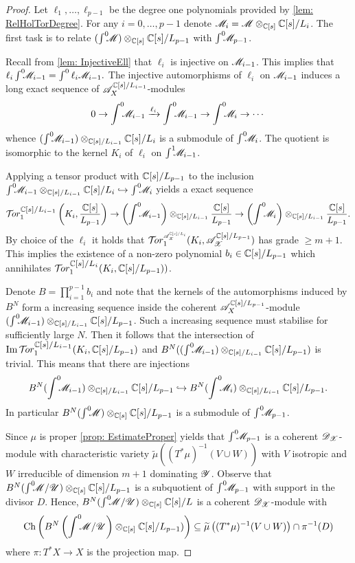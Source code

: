 \begin{proof}
  Let $\ell_1,\ldots,\ell_{p-1}$ be the degree one polynomials provided by \cref{lem: RelHolTorDegree}.
  For any $i=0,\ldots, p-1$ denote $\mathscr{M}_i =  \mathscr{M} \otimes_{\mathbb{C}[s]} \mathbb{C}[s]/L_{i}$.
  The first task is to relate $(\int^0 \mkern -8mu\mathscr{M}) \otimes_{\mathbb{C}[s]} \mathbb{C}[s]/L_{p-1}$ with $\int^0 \mkern -8mu\mathscr{M}_{p-1}$.

  Recall from \cref{lem: InjectiveEll} that $\ell_{i}$ is injective on $\mathscr{M}_{i-1}$.
  This implies that
  $\ell_{i}\int^0 \mkern -8mu \mathscr{M}_{i-1} = \int^0 \ell_{i}\mathscr{M}_{i-1}.$
  The injective automorphisms of $\ell_i$ on $\mathscr{M}_{i-1}$ induces a long exact sequence of $\mathscr{A}_X^{\mathbb{C}[s]/L_{i-1}}$-modules
  $$0 \to \int^0 \mkern -8mu\mathscr{M}_{i-1} \xrightarrow{\ell_i} \int^0 \mkern -8mu \mathscr{M}_{i-1} \to \int^0 \mkern -8mu \mathscr{M}_i \to \cdots $$
  whence $(\int^0 \mkern -8mu \mathscr{M}_{i-1})\otimes_{\mathbb{C}[s]/L_{i-1}} \mathbb{C}[s]/L_i$ is a submodule of $\int^0 \mkern -8mu\mathscr{M}_i$.
  The quotient is isomorphic to the kernel $K_i$ of $\ell_i$ on $\int^1\mkern -8mu\mathscr{M}_{i-1}$.

  Applying a tensor product with $\mathbb{C}[s]/L_{p-1}$ to the inclusion $\int^0 \mkern -8mu \mathscr{M}_{i-1} \otimes_{\mathbb{C}[s]/L_{i-1}} \mathbb{C}[s]/L_i \hookrightarrow \int^0 \mkern -8mu\mathscr{M}_i$ yields a exact sequence
  $$\Tr{\C[s]/L_{i-1}}{1}\left(K_i, \frac{\C[s]}{L_{p-1}}\right) \to \left(\Int \M_{i-1}\right) \otimes_{\C[s]/L_{i-1}}\frac{\C[s]}{L_{p-1}} \to \left(\Int\M_i\right) \otimes_{\C[s]/L_{i-1}}\frac{\C[s]}{L_{p-1}}.$$
  By choice of the $\ell_i$ it holds that $\Tr{\A_\X^{\C[s]/L_i} }{1}(K_i, \A_\X^{\C[s]/L_{p-1}})$ has grade $\geq m+1$.
  This implies the existence of a non-zero polynomial $b_i\in \mathbb{C}[s]/L_{p-1}$ which annihilates $\Tr{\C[s]/L_{i}}{1}(K_i, \C[s]/\ab L_{p-1} ))$.

  Denote $B = \prod_{i=1}^{p-1}b_i$ and note that the kernels of the automorphisms induced by $B^N$ form a increasing sequence inside the coherent $\mathscr{A}_X^{\mathbb{C}[s]/L_{p-1}}$-module $(\int^0 \mkern -8mu \mathscr{M}_{i-1})\otimes_{\mathbb{C}[s]/L_{i-1}}\mathbb{C}[s]/L_{p-1}$.
  Such a increasing sequence must stabilise for sufficiently large $N$.
  Then it follows that the intersection of $\img \Tr{\C[s]/L_{i-1}}{1}(K_i, \C[s]/L_{p-1})$ and $ B^N((\int^0 \mkern -8mu \mathscr{M}_{i-1}) \otimes_{\mathbb{C}[s]/L_{i-1}}\mathbb{C}[s]/L_{p-1})$ is trivial.
  This means that there are injections $$B^N (\int^0 \mkern -8mu \mathscr{M}_{i-1}) \otimes_{\mathbb{C}[s]/L_{i-1}}\mathbb{C}[s]/L_{p-1} \hookrightarrow B^N (\int^0 \mkern -8mu\mathscr{M}_i)\otimes_{\mathbb{C}[s]/L_{i-1}}\mathbb{C}[s]/L_{p-1}.$$
  In particular $B^N(\int^0 \mkern -8mu\mathscr{M})\otimes_{\mathbb{C}[s]}\mathbb{C}[s]/L_{p-1}$ is a submodule of $\int^0 \mkern -8mu\mathscr{M}_{p-1}$.


  Since $\mu$ is proper \cref{prop: EstimateProper} yields that $\int^0 \mkern -8mu \mathscr{M}_{p-1}$ is a coherent $\mathscr{D}_{\mathscr{X}}$-module with characteristic variety $\widetilde{\mu}((T^*\mu)^{-1}(V\cup W))$ with $V$ isotropic and $W$ irreducible of dimension $m+1$ dominating $\mathscr{Y}$.
  Observe that $B^N(\int^0 \mkern -8mu\mathscr{M}/ \mathscr{U})\otimes_{\mathbb{C}[s]}\mathbb{C}[s]/L_{p-1}$ is a subquotient of $\int^0 \mkern -8mu\mathscr{M}_{p-1}$ with support in the divisor $D$.
  Hence, $B^N(\int^0 \mkern -8mu\mathscr{M}/ \mathscr{U})\otimes_{\mathbb{C}[s]}\mathbb{C}[s]/L$ is a coherent $\mathscr{D}_{\mathscr{X}}$-module with
  $$\operatorname{Ch}\left( B^N\left(\int^0 \mkern -8mu\mathscr{M}/ \mathscr{U}\right)\otimes_{\mathbb{C}[s]}\mathbb{C}[s]/L_{p-1}) \right)\subseteq  \widetilde{\mu}\left((T^*\mu)^{-1}(V\cup W)\right) \cap \pi^{-1}(D)$$
  where $\pi:T^*X\to X$ is the projection map.


\end{proof}
